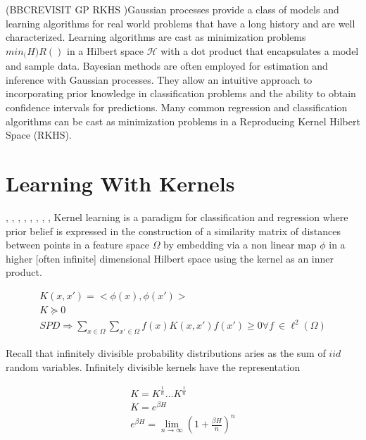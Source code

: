 (BBCREVISIT GP  RKHS )Gaussian processes provide a class of models and learning algorithms for real world problems that have a long history and are well characterized. Learning algorithms are cast as minimization problems $min_\mathcal(H) R() $ in a Hilbert space $ \mathcal{H}$ with a dot product that encapsulates a model and sample data.  Bayesian methods are often employed for estimation and inference with Gaussian processes. They allow an intuitive approach to incorporating prior knowledge in classification problems and the ability to obtain confidence intervals for predictions.  Many common regression and classification algorithms can be cast as minimization problems in a Reproducing Kernel Hilbert Space (RKHS).


\section*{Learning With Kernels}
\cite{KLBurges98atutorial}, \cite{KLKeerthi99improvementsto}, \cite{KLProgramminglearningthe},
\cite{KLScholkopf00newsupport}, \cite{KLScholkopf00statisticallearning}, \cite{KLShevade99improvementsto},
\cite{KLTsang03distancemetric}, \cite{KLWeston00featureselection}, \cite{KLSchultz03learninga}
Kernel learning is a paradigm for classification and regression where prior belief is expressed in the construction of a similarity matrix of distances between points in a feature space $\Omega$ by embedding via a non linear map $\phi$ in a higher [often infinite] dimensional Hilbert space using the kernel as an inner product.
\begin{center}\begin{eqnarray*}
  K(x,x')= <\phi(x),\phi(x')> \\
  K \succeq 0 \\
  SPD \Rightarrow \sum\limits_{x \in \Omega}^{}  \sum\limits_{x' \in \Omega}^{} f(x) K(x,x') f(x') \geq 0 \forall f\ \in \ell^2(\Omega)
\end{eqnarray*}\end{center}
Recall that infinitely divisible probability distributions aries as the sum of $iid$ random variables.  Infinitely divisible kernels have the representation
\begin{center}\begin{eqnarray*}
K=K^{\frac{1}{n}} \ldots K^{\frac{1}{n}} \\
K= e^{\beta H} \\
e^{\beta H} = \lim\limits_{n\rightarrow \infty} (1+ \frac{\beta H}{n} )^n
\end{eqnarray*}\end{center}
